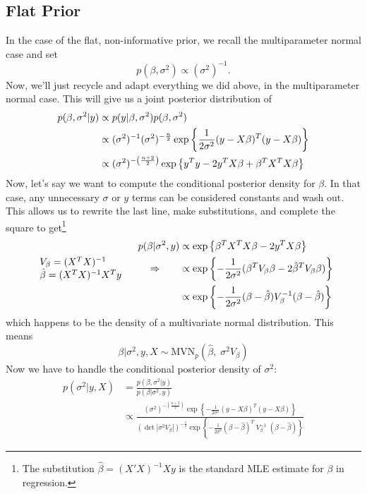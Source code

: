 \documentclass[a4paper,12pt]{scrartcl}
\begin{document}
\subsection{Flat Prior}

In the case of the flat, non-informative prior, we recall the 
multiparameter normal case and set
   \[ p(\beta, \sigma^2) \propto (\sigma^2)^{-1}.\]
Now, we'll just recycle and adapt everything we did above, 
in the multiparameter normal case. This will give us a 
joint posterior distribution of
\begin{align}
   p(\beta, \sigma^2 | y) &\propto 
   p(y | \beta, \sigma^2 ) p(\beta, \sigma^2) \notag\\
   &\propto (\sigma^2)^{-1} (\sigma^2)^{-\frac{n}{2}}
      \exp\left\{ \frac{1}{2\sigma^2} 
   (y - X\beta)^T (y-X\beta)\right\} \notag\\
   &\propto (\sigma^2)^{-\left(\frac{n+2}{2}\right)} 
      \exp\left\{ y^T y-2 y^T X\beta+\beta^T X^T X \beta\right\} \notag
\end{align}
Now, let's say we want to compute the conditional posterior density
for $\beta$.  In that case, any unnecessary
$\sigma$ or $y$ terms can be considered constants
and wash out. This allows us to rewrite the last line, make 
substitutions, and complete the square
to get\footnote{The substitution $\hat{\beta} =
(X'X)^{-1} X y$ is the standard MLE estimate for $\beta$ in 
regression.}
\begin{align}
   p(\beta | \sigma^2, y) &\propto \exp\left\{ \beta^T X^T X \beta -
      2y^T X\beta\right\} \notag\\
   \begin{tabular}{l} $V_\beta = (X^T X)^{-1}$ \\ $\hat{\beta} =
      (X^T X)^{-1} X^T y$ \end{tabular} \qquad\Rightarrow \qquad  
      &\propto 
      \exp\left\{ -\frac{1}{2\sigma^2} (\beta^T V_\beta \beta  - 
      2\hat{\beta}^T V_\beta \beta) \right\} \notag\\
   &\propto \exp\left\{ -\frac{1}{2\sigma^2} (\beta - \hat{\beta})
   V_\beta^{-1} (\beta - \hat{\beta}) \right\}\notag
\end{align}
which happens to be the density of a multivariate normal distribution.
This means 
\[ \beta | \sigma^2, y, X \sim 
   \text{MVN}_p(\hat{\beta},\;\sigma^2 V_\beta)
   \]
Now we have to handle the conditional posterior density of $\sigma^2$:
\begin{align*}
   p(\sigma^2 | y, X) &= \frac{ p(\beta, \sigma^2 | y)}{p(\beta |
      \sigma^2, y)} \\
   &\propto \frac{ (\sigma^2)^{-\left(\frac{n+2}{2}\right)} 
   \exp\left\{ -\frac{1}{2\sigma^2} (y-X\beta)^T(y - X\beta)\right\}}{
	 (\det|\sigma^2 V_\beta|)^{-\frac{1}{2}} 
	 \exp\left\{ -\frac{1}{2\sigma^2} (\beta - \hat{\beta})^T
	 \; V^{-1}_\beta\; (\beta - \hat{\beta})\right\}
      }
\end{align*}
\end{document}
